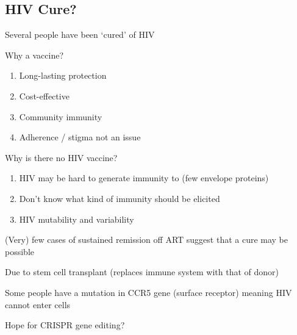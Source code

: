 \documentclass{notes}
\begin{document}
\subsection{HIV Cure?}

Several people have been `cured' of HIV

Why a vaccine?

\begin{enumerate}
    \item Long-lasting protection
    \item Cost-effective
    \item Community immunity
    \item Adherence / stigma not an issue
\end{enumerate}

Why is there no HIV vaccine?

\begin{enumerate}
    \item HIV may be hard to generate immunity to (few envelope proteins)
    \item Don't know what kind of immunity should be elicited
    \item HIV mutability and variability
\end{enumerate}

(Very) few cases of sustained remission off ART suggest that a cure may be possible

\tab Due to stem cell transplant (replaces immune system with that of donor)

Some people have a mutation in CCR5 gene (surface receptor) meaning HIV cannot enter cells

\tab Hope for CRISPR gene editing?
\end{document}
